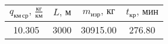 \begin{tabular}{|c|c|c|c|}
\hline
$q_{км\, ср},\, \frac{кг}{км}$ & $L,\, м$ & $m_{изр},\, кг$ & $t_{кр},\, мин$ \\ 
\hline
10.305 & 3000 & 30915.00 & 276.80 \\ 
\hline
\end{tabular}